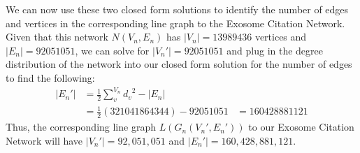 \documentclass[12pt, oneside]{article}   	%
\begin{document}
We can now use these two closed form solutions to identify the number of edges and vertices in the corresponding line graph to the Exosome Citation Network. Given that this network $N(V_n, E_n)$ has $|V_n| = 13989436$ vertices and $|E_n| = 92051051$, we can solve for $|V_n'| = 92051051$ and plug in the degree distribution of the network into our closed form solution for the number of edges to find the following:
\begin{equation}
    \begin{aligned}
    |E_n'| &= \frac{1}{2}\sum^{V_n}_{v} {d_v}^2 - |E_n|\\
    &= \frac{1}{2}(321041864344) - 92051051
    &= 160428881121
    \end{aligned}
\end{equation}
Thus, the corresponding line graph $L(G_n(V_n', E_n'))$ to our Exosome Citation Network will have $|V_n'| = 92,051,051$ and $|E_n'| = 160,428,881,121$. 





\end{document}
